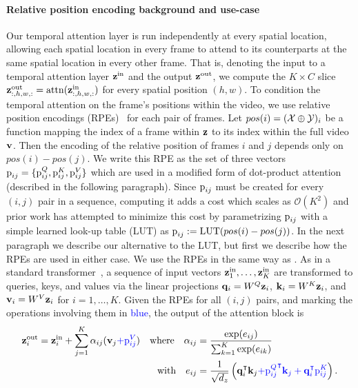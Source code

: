 \paragraph{Relative position encoding background and use-case} Our temporal attention layer is run independently at every spatial location, allowing each spatial location in every frame to attend to its counterparts at the same spatial location in every other frame. That is, denoting the input to a temporal attention layer ${\mathbf{z}}^\text{in}$ and the output ${\mathbf{z}}^\text{out}$, we compute the $K \times C$ slice ${\mathbf{z}}^\text{out}_{:,h,w,:} = \text{attn}({\mathbf{z}}^\text{in}_{:,h,w,:})$ for every spatial position $(h,w)$. To condition the temporal attention on the frame's positions within the video, we use relative position encodings (RPEs)~\citep{shaw2018self,wu2021rethinking} for each pair of frames. Let $pos(i) = (\mathcal{X}\oplus\mathcal{Y})_i$ be a function mapping the index of a frame within ${\mathbf{z}}$ to its index within the full video ${\mathbf{v}}$. Then the encoding of the relative position of frames $i$ and $j$ depends only on $pos(i)-pos(j)$. We write this RPE as the set of three vectors ${\textnormal{p}}_{ij} = \{{\textnormal{p}}_{ij}^Q, {\textnormal{p}}_{ij}^K, {\textnormal{p}}_{ij}^V\}$ which are used in a modified form of dot-product attention (described in the following paragraph). Since ${\textnormal{p}}_{ij}$ must be created for every $(i,j)$ pair in a sequence, computing it adds a cost which scales as $\mathcal{O}(K^2)$ and prior work has attempted to minimize this cost by parametrizing ${\textnormal{p}}_{ij}$ with a simple learned look-up table (LUT) as ${{\textnormal{p}}_{ij} := \text{LUT}(pos(i)-pos(j))}$. In the next paragraph we describe our alternative to the LUT, but first we describe how the RPEs are used in either case. We use the RPEs in the same way as \citet{shaw2018self}. As in a standard transformer~\citep{vaswani2017attention}, a sequence of input vectors ${\mathbf{z}}_1^\text{in},\ldots,{\mathbf{z}}_{K}^\text{in}$ are transformed to queries, keys, and values via the linear projections ${\mathbf{q}}_i = W^Q {\mathbf{z}}_i$, ${\mathbf{k}}_i = W^K {\mathbf{z}}_i$, and ${\mathbf{v}}_i = W^V {\mathbf{z}}_i$ for $i=1,\ldots,K$. Given the RPEs for all $(i,j)$ pairs, and marking the operations involving them in \textcolor{blue}{blue}, the output of the attention block is
\begin{align}
    {\mathbf{z}}_i^\text{out} = {\mathbf{z}}^\text{in}_i + \sum_{j=1}^K \alpha_{ij}({\mathbf{v}}_j \textcolor{blue}{+ {\textnormal{p}}_{ij}^V}) \quad \text{where} \quad \alpha_{ij} &= \frac{\exp(e_{ij})}{\sum_{k=1}^K\exp(e_{ik})} \\
    \text{with} \quad e_{ij} &= \frac{1}{\sqrt{d_z}} \left( {\mathbf{q}}_i^\intercal {\mathbf{k}}_j \textcolor{blue}{+ {{\textnormal{p}}_{ij}^Q}^\intercal {\mathbf{k}}_j + {\mathbf{q}}_i^\intercal {{\textnormal{p}}_{ij}^K}} \right). \nonumber
\end{align}


